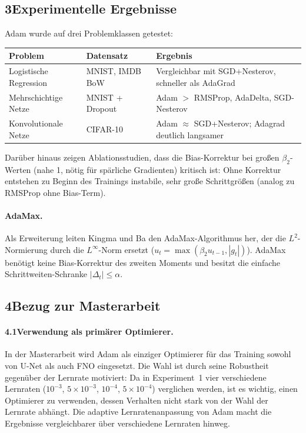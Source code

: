 \documentclass[a4paper,12pt]{article}
\begin{document}
\subsection*{3\quad Experimentelle Ergebnisse}

Adam wurde auf drei Problemklassen getestet:

\begin{center}
\begin{tabular}{lll}
\toprule
\textbf{Problem} & \textbf{Datensatz} & \textbf{Ergebnis} \\
\midrule
Logistische Regression & MNIST, IMDB BoW & Vergleichbar mit SGD+Nesterov, schneller als AdaGrad \\
Mehrschichtige Netze   & MNIST + Dropout  & Adam $>$ RMSProp, AdaDelta, SGD-Nesterov \\
Konvolutionale Netze   & CIFAR-10         & Adam $\approx$ SGD+Nesterov; Adagrad deutlich langsamer \\
\bottomrule
\end{tabular}
\end{center}

Darüber hinaus zeigen Ablationsstudien, dass die Bias-Korrektur bei großen $\beta_2$-Werten
(nahe 1, nötig für spärliche Gradienten) kritisch ist: Ohne Korrektur entstehen zu Beginn des
Trainings instabile, sehr große Schrittgrößen (analog zu RMSProp ohne Bias-Term).

\paragraph{AdaMax.}
Als Erweiterung leiten Kingma und Ba den AdaMax-Algorithmus her, der die $L^2$-Normierung
durch die $L^\infty$-Norm ersetzt ($u_t = \max(\beta_2 u_{t-1}, |g_t|)$). AdaMax benötigt
keine Bias-Korrektur des zweiten Moments und besitzt die einfache Schrittweiten-Schranke
$|\Delta_t| \leq \alpha$.

\subsection*{4\quad Bezug zur Masterarbeit}

\paragraph{4.1\quad Verwendung als primärer Optimierer.}
In der Masterarbeit wird Adam als einziger Optimierer für das Training sowohl von U-Net als auch
FNO eingesetzt. Die Wahl ist durch seine Robustheit gegenüber der Lernrate motiviert: Da in
Experiment~1 vier verschiedene Lernraten ($10^{-3}$, $5 \times 10^{-3}$, $10^{-4}$, $5 \times 10^{-4}$)
verglichen werden, ist es wichtig, einen Optimierer zu verwenden, dessen Verhalten nicht stark
von der Wahl der Lernrate abhängt. Die adaptive Lernratenanpassung von Adam macht die
Ergebnisse vergleichbarer über verschiedene Lernraten hinweg.
\end{document}
